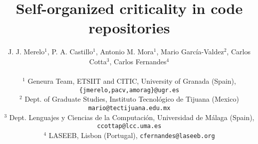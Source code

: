 \documentclass[letterpaper]{article}
\begin{document}



\title{Self-organized criticality in code repositories}

\author{J. J. Merelo$^{1}$, P. A. Castillo$^{1}$, Antonio M. Mora$^1$, Mario
  Garc\'ia-Valdez$^{2}$, Carlos Cotta${^3}$, Carlos Fernandes${^4}$ \\
\mbox{}\\
$^1$ Geneura Team, ETSIIT and CITIC, University of Granada (Spain),
{\tt \{jmerelo,pacv,amorag\}@ugr.es}\\
$^2$ Dept. of Graduate Studies, Instituto Tecnol\'ogico de Tijuana
(Mexico) {\tt mario@tectijuana.edu.mx}\\
$^3$ Dept. Lenguajes y Ciencias de la Computaci\'on, Universidad de M\'alaga (Spain), {\tt ccottap@lcc.uma.es}\\
$^4$ LASEEB, Lisbon (Portugal), {\tt cfernandes@laseeb.org}
}

\end{document}
